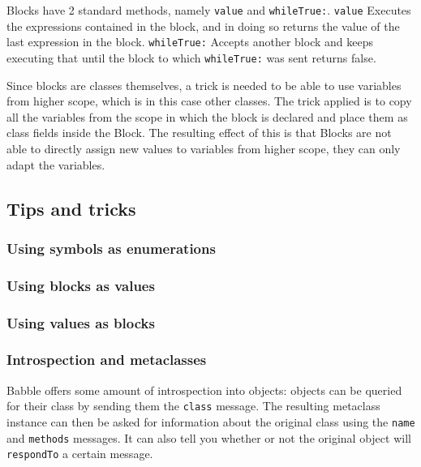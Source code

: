 \documentclass[a4paper]{article}
\begin{document}
Blocks have 2 standard methods, namely \verb|value| and \verb|whileTrue:|. \verb|value| Executes the expressions contained in the block, and in doing so returns the value of the last expression in the block. \verb|whileTrue:| Accepts another block and keeps executing that until the block to which \verb|whileTrue:| was sent returns false.

Since blocks are classes themselves, a trick is needed to be able to use variables from higher scope, which is in this case other classes. The trick applied is to copy all the variables from the scope in which the block is declared and place them as class fields inside the Block. The resulting effect of this is that Blocks are not able to directly assign new values to variables from higher scope, they can only adapt the variables.



\subsection{Tips and tricks}

\subsubsection{Using symbols as enumerations}

\subsubsection{Using blocks as values}

\subsubsection{Using values as blocks}

\subsubsection{Introspection and metaclasses}

Babble offers some amount of introspection into objects: objects can be queried for their class by sending them the \texttt{class} message.
The resulting metaclass instance can then be asked for information about the original class using the \texttt{name} and \texttt{methods} messages.
It can also tell you whether or not the original object will \texttt{respondTo} a certain message.
\end{document}
